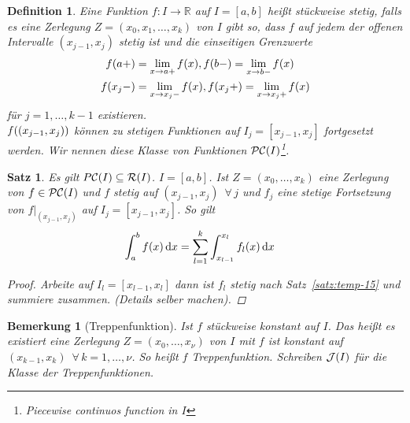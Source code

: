 \documentclass[11pt, twoside, a4paper]{article}
\theoremstyle{plain}
\newtheorem{bemerkung}[blockelement]{Bemerkung}
\newtheorem{definition}[blockelement]{Definition}
\newtheorem{satz}[blockelement]{Satz}
\numberwithin{equation}{subsection}
\newcommand{\pair}[1]{\left(#1\right)}
\newcommand{\of}[1]{\mathopen{}\mathclose{}\bgroup\left(#1\aftergroup\egroup\right)}
\newcommand{\interv}[1]{\left[#1\right]}
\newcommand{\fromto}{\rightarrow{}}
\newcommand{\dif}{\mathop{}\!\mathrm{d}}
\newcommand{\fa}{\;\forall\,}
\newcommand{\R}{\mathbb{R}}
\newcommand{\mR}{\mathcal{R}}
\newcommand{\mC}{\mathcal{C}}
\newcommand{\mJ}{\mathcal{J}}
\newcommand{\mPC}{\mathcal{PC}}
\begin{document}
    \begin{definition}
        Eine Funktion $f: I\fromto\R$ auf $I=\interv{a,b}$ heißt stückweise stetig, falls es eine Zerlegung $Z = \pair{x_0, x_1, \dots, x_k}$ von $I$ gibt so, dass $f$ auf jedem der offenen Intervalle $\pair{x_{j-1}, x_j}$ stetig ist und die einseitigen Grenzwerte
        \begin{align*}
            f\of{a+} &= \lim_{x\fromto a+} f\of{x}, f\of{b-} = \lim_{x\fromto b-} f\of{x}\\
            f\of{x_j-} &= \lim_{x\fromto x_j-} f\of{x}, f\of{x_j+} = \lim_{x\fromto x_j+} f\of{x}
        \end{align*}
        für $j=1, \dots, k-1$ existieren.\\
        $f\of{\pair{x_{j-1}, x_j}}$ können zu stetigen Funktionen auf $I_j=\interv{x_{j-1}, x_j}$ fortgesetzt werden. Wir nennen diese Klasse von Funktionen $\mPC\of{I}$\footnote{Piecewise continuos function in $I$}.
    \end{definition}

    \begin{satz} %
        \label{satz:temp-17}
        Es gilt $P\mC\of{I} \subseteq \mR\of{I}$. $I=\interv{a,b}$. Ist $Z=\pair{x_0, \dots, x_k}$ eine Zerlegung von $f\in \mPC\of{I}$ und $f$ stetig auf $\pair{x_{j-1}, x_j}~\fa j$ und $f_j$ eine stetige Fortsetzung von $f\vert_{\pair{x_{j-1}, x_j}}$ auf $I_j = \interv{x_{j-1}, x_j}$. So gilt
        \begin{align*}
            \int_{a}^{b} f\of{x} \dif x &= \sum_{l=1}^{k} \int_{x_{l-1}}^{x_l} f_l\of{x}\dif x
        \end{align*}
        \begin{proof}
            Arbeite auf $I_l = \interv{x_{l-1}, x_{l}}$ dann ist $f_l$ stetig nach Satz~\ref{satz:temp-15} und summiere zusammen. (Details selber machen).
        \end{proof}
    \end{satz}

    \begin{bemerkung}[Treppenfunktion]
        Ist $f$ stückweise konstant auf $I$. Das heißt es existiert eine Zerlegung $Z=\pair{x_0, \dots, x_{\nu}}$ von $I$ mit $f$ ist konstant auf $\pair{x_{k-1}, x_k}~\fa k=1, \dots, \nu$. So heißt $f$ Treppenfunktion. Schreiben $\mJ\of{I}$ für die Klasse der Treppenfunktionen.
    \end{bemerkung}
\end{document}
